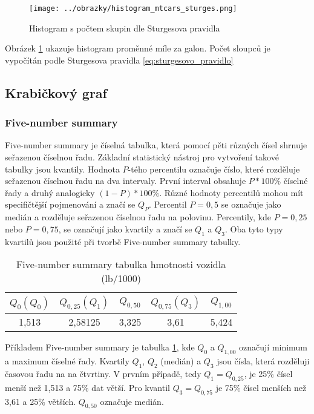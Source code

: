 \begin{figure}[H]
    \centering
    \texttt{[image: ../obrazky/histogram\_mtcars\_sturges.png]}
    \caption{Histogram s počtem skupin dle Sturgesova pravidla} 
    \label{fig:histogram_mtcars_sturges}
\end{figure}

{\color{red}
Obrázek \ref{fig:histogram_mtcars_sturges} ukazuje histogram proměnné míle za galon. Počet sloupců je vypočítán podle Sturgesova pravidla \ref{eq:sturgesovo_pravidlo} 
}

\subsection{Krabičkový graf}
\subsubsection{Five-number summary}
Five-number summary je číselná tabulka, která pomocí pěti různých čísel shrnuje seřazenou číselnou řadu. Základní statistický nástroj pro
vytvoření takové tabulky jsou kvantily. Hodnota $P$-tého percentilu označuje číslo, které rozděluje seřazenou číselnou řadu na dva intervaly. 
První interval obsahuje $P*100\%$ číselné řady a druhý analogicky $(1-P)*100\%$. Různé hodnoty percentilů mohou mít specifičtější pojmenování a značí se $Q_P$.
Percentil $P = 0,5$ se označuje jako medián a rozděluje seřazenou číselnou řadu na polovinu. Percentily, kde $P = 0,25$ nebo $P = 0,75$, se označují
jako kvartily a značí se $Q_{1}$ a $Q_{3}$. Oba tyto typy kvartilů jsou použité při tvorbě Five-number summary tabulky.

\begin{table}[H]
    \centering
    \begin{tabular}[t]{c|c|c|c|c}
        \hline
        $Q_{0} (Q_0)$ & $Q_{0,25} (Q_1) $ & $Q_{0,50}$ & $Q_{0,75} (Q_3)$ & $Q_{1,00}$\\
        \hline
        1,513 & 2,58125 & 3,325 & 3,61 & 5,424\\
        \hline
    \end{tabular}
    \caption{\label{tab:five-number_summary}Five-number summary tabulka hmotnosti vozidla (lb/1000)}
\end{table}

{\color{red}
Příkladem Five-number summary je tabulka \ref{tab:five-number_summary},
}
kde $Q_{0}$ a $Q_{1,00}$ označují minimum a maximum číselné řady. Kvartily $Q_{1}$, $Q_{2}$ (medián) a $Q_{3}$ jsou čísla, která rozděluji časovou řadu na na čtvrtiny. V prvním
případě, tedy $Q_1 = Q_{0,25}$, je 25\% čísel menší než 1,513 a 75\% dat větší. Pro kvantil $Q_3 = Q_{0,75}$ je 75\% čísel menších než 3,61 a 25\% větších. $Q_{0,50}$ označuje medián.

